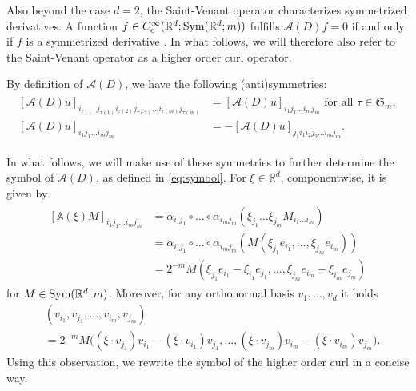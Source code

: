 \documentclass[a4paper, 10pt, twoside, notitlepage]{amsart}
\theoremstyle{plain}
\newcommand{\R}{\mathbb{R}}
\newcommand{\A}{\mathcal{A}}
\renewcommand{\AA}{\mathbb{A}}
\renewcommand{\S}[1]{\textup{Sym}(\R^d;#1)}
\begin{document}
	Also beyond the case $d=2$, the Saint-Venant operator characterizes symmetrized derivatives:
	A function $f \in C^\infty_c(\R^d;\S{m})$ fulfills $\A(D)f = 0$ if and only if $f$ is a symmetrized derivative \cite[Thm. 2.2.1, Eq. (2.4.6), (2.4.7)]{Sha94}.
In what follows, we will therefore also refer to the Saint-Venant operator as a higher order curl operator.
        
          By definition of $\A(D)$, we have the following (anti)symmetries:
          \begin{align}
          \label{eq:sym}
          \begin{split}
            [\A(D)u]_{i_{\tau(1)} j_{\tau(1)} i_{\tau(2)} j_{\tau(2)} \dots i_{\tau(m)} j_{\tau(m)}}& = [\A(D) u]_{i_1 j_1 \dots i_m j_m} \text{ for all } \tau \in \mathfrak{S}_m, \\
            [\A(D)u]_{i_1j_1\dots i_mj_m} & = - [\A(D)u]_{j_1 i_1 i_2 j_2 \dots i_m j_m}.
            \end{split}
          \end{align}
          

          In what follows, we will make use of these symmetries to further determine the symbol of $\A(D)$, as defined in \eqref{eq:symbol}.
          For $\xi \in \R^d$, componentwise, it is given by
	\begin{align} \label{eq:Symbol_SVO}
		\begin{split}
			[\AA(\xi) M]_{i_1 j_1 \dots i_m j_m} & = \alpha_{i_1 j_1} \circ \dots \circ \alpha_{i_m j_m} (\xi_{j_1} \dots \xi_{j_m} M_{i_1 \dots i_m}) \\
			& = \alpha_{i_1 j_1} \circ \dots \circ \alpha_{i_m j_m} (M(\xi_{j_1} e_{i_1},\dots, \xi_{j_m} e_{i_m})) \\
			& = 2^{-m}  M(\xi_{j_1} e_{i_1} - \xi_{i_1} e_{j_1}, \dots, \xi_{j_m} e_{i_m} - \xi_{i_m} e_{j_m})
		\end{split}
	\end{align}
	for $M \in \S{m}$.  Moreover, for any orthonormal basis $v_1,\dots,v_d$ it holds
	\begin{align*} [\AA(\xi)M]&(v_{i_1},v_{j_1},\dots,v_{i_m},v_{j_m}) \\
          & = 2^{-m} M\Big((\xi \cdot v_{j_1}) v_{i_1} - (\xi \cdot v_{i_1}) v_{j_1},\dots, (\xi \cdot v_{j_m}) v_{i_m} - (\xi \cdot
		v_{i_m}) v_{j_m}\Big).
	\end{align*}
	Using this observation, we rewrite the symbol of the higher order curl in a concise way.
	
\end{document}
